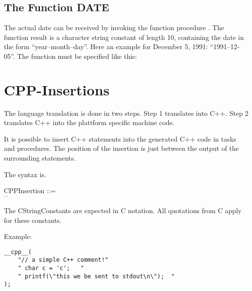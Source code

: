 \code{ ;} 


\subsection{The Function DATE}    %
\label{sec_function_date}

The actual date can be received by invoking the function procedure .
The function result is a character string constant of length 10, containing
the date in the form ``year--month--day''. Here an example for December 5,
1991: ``1991--12-05''. The function must  be specified like this:\\

\code{ ;}

\section{CPP-Insertions}
The language translation is done in two steps.
Step 1 translates \OpenPEARL{} into C++.
Step 2 translates C++ into the plattform specific machine code.

It is possible to insert C++ statements into the generated C++ 
code in tasks and procedures. The position of the insertion is
just between the output of the surrounding
statements.

The syntax is.
\begin{grammarframe}
CPPInsertion ::=\\
\x {} \kw{(} $^{...}$ \kw{)} \kw{;}
\end{grammarframe}
The CStringConstants are expected in C notation.
All quotations from C apply for these constants.

Example:
\begin{lstlisting}
__cpp__(	
    "// a simple C++ comment!"
    " char c = 'c';   " 
    " printf(\"this we be sent to stdout\n\");  " 
);
\end{lstlisting}


\newpage
